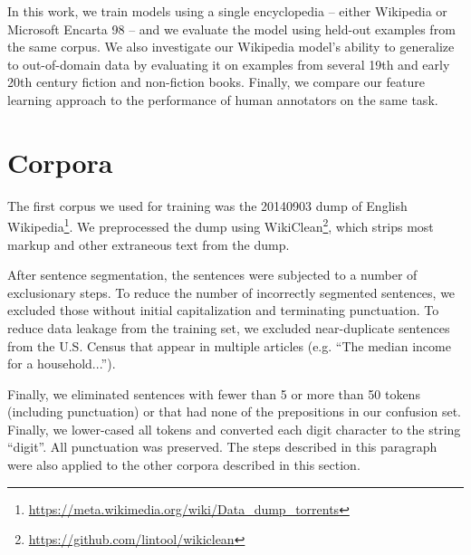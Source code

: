 In this work, we train models using a single encyclopedia -- either Wikipedia or Microsoft Encarta 98 -- and we evaluate the model using held-out examples from the same corpus.  We also investigate our Wikipedia model's ability to generalize to out-of-domain data by evaluating it on examples from several 19th and early 20th century fiction and non-fiction books.  Finally, we compare our feature learning approach to the performance of human annotators on the same task.  


\section{Corpora}
\label{sec:PrepositionCorpora}

The first corpus we used for training was the 20140903 dump of English Wikipedia\footnote{\url{https://meta.wikimedia.org/wiki/Data\_dump\_torrents}}.  We preprocessed the dump using WikiClean\footnote{\url{https://github.com/lintool/wikiclean}}, which strips most markup and other extraneous text from the dump.  

After sentence segmentation, the sentences were subjected to a number of exclusionary steps.  To reduce the number of incorrectly segmented sentences, we excluded those without initial capitalization and terminating punctuation.  To reduce data leakage from the training set, we excluded near-duplicate sentences from the U.S. Census that appear in multiple articles (e.g. ``The median income for a household...'').  


Finally, we eliminated sentences with fewer than 5 or more than 50 tokens (including punctuation) or that had none of the prepositions in our confusion set.  Finally, we lower-cased all tokens and converted each digit character to the string ``digit''.  All punctuation was preserved.  The steps described in this paragraph were also applied to the other corpora described in this section. 


